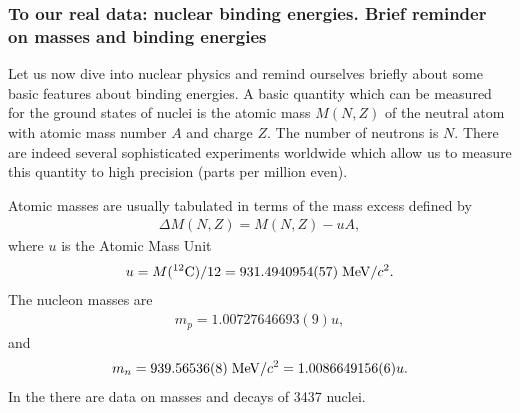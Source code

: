 \documentclass[letterpaper,10pt,english]{sphinxmanual}
\begin{document}
\begin{sphinxVerbatim}[commandchars=\\\{\}]
 
       
     

 
\end{sphinxVerbatim}


\subsubsection{To our real data: nuclear binding energies. Brief reminder on masses and binding energies}
\label{\detokenize{chapter3:to-our-real-data-nuclear-binding-energies-brief-reminder-on-masses-and-binding-energies}}
Let us now dive into  nuclear physics and remind ourselves briefly about some basic features about binding
energies.  A basic quantity which can be measured for the ground
states of nuclei is the atomic mass \(M(N, Z)\) of the neutral atom with
atomic mass number \(A\) and charge \(Z\). The number of neutrons is \(N\). There are indeed several sophisticated experiments worldwide which allow us to measure this quantity to high precision (parts per million even).

Atomic masses are usually tabulated in terms of the mass excess defined by
\begin{equation*}
\begin{split}
\Delta M(N, Z) =  M(N, Z) - uA,
\end{split}
\end{equation*}
where \(u\) is the Atomic Mass Unit
\begin{equation*}
\begin{split}
u = M(^{12}\mathrm{C})/12 = 931.4940954(57) \hspace{0.1cm} \mathrm{MeV}/c^2.
\end{split}
\end{equation*}
The nucleon masses are
\begin{equation*}
\begin{split}
m_p =  1.00727646693(9)u,
\end{split}
\end{equation*}
and
\begin{equation*}
\begin{split}
m_n = 939.56536(8)\hspace{0.1cm} \mathrm{MeV}/c^2 = 1.0086649156(6)u.
\end{split}
\end{equation*}
In the 
there are data on masses and decays of 3437 nuclei.
\end{document}
